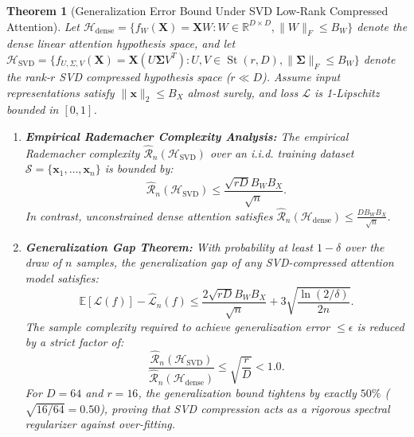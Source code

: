 \documentclass[journal]{IEEEtran}
\newtheorem{theorem}{Theorem}
\begin{document}
\begin{theorem}[Generalization Error Bound Under SVD Low-Rank Compressed Attention]
Let $\mathcal{H}_{\text{dense}} = \{ f_W(\mathbf{X}) = \mathbf{X} W : W \in \mathbb{R}^{D \times D}, \|W\|_F \le B_W \}$ denote the dense linear attention hypothesis space, and let $\mathcal{H}_{\text{SVD}} = \{ f_{U, \Sigma, V}(\mathbf{X}) = \mathbf{X} (U \boldsymbol{\Sigma} V^T) : U, V \in \operatorname{St}(r, D), \|\boldsymbol{\Sigma}\|_F \le B_W \}$ denote the rank-$r$ SVD compressed hypothesis space ($r \ll D$).
Assume input representations satisfy $\|\mathbf{x}\|_2 \le B_X$ almost surely, and loss $\mathcal{L}$ is 1-Lipschitz bounded in $[0, 1]$.

\begin{enumerate}
    \item \textbf{Empirical Rademacher Complexity Analysis:}
    The empirical Rademacher complexity $\hat{\mathcal{R}}_n(\mathcal{H}_{\text{SVD}})$ over an i.i.d. training dataset $\mathcal{S} = \{\mathbf{x}_1, \dots, \mathbf{x}_n\}$ is bounded by:
    \begin{equation}
    \hat{\mathcal{R}}_n(\mathcal{H}_{\text{SVD}}) \le \frac{\sqrt{r D} B_W B_X}{\sqrt{n}}.
    \end{equation}
    In contrast, unconstrained dense attention satisfies $\hat{\mathcal{R}}_n(\mathcal{H}_{\text{dense}}) \le \frac{D B_W B_X}{\sqrt{n}}$.
    
    \item \textbf{Generalization Gap Theorem:}
    With probability at least $1 - \delta$ over the draw of $n$ samples, the generalization gap of any SVD-compressed attention model satisfies:
    \begin{equation}
    \mathbb{E}[\mathcal{L}(f)] - \hat{\mathcal{L}}_n(f) \le \frac{2 \sqrt{r D} B_W B_X}{\sqrt{n}} + 3 \sqrt{\frac{\ln(2/\delta)}{2n}}.
    \end{equation}
    The sample complexity required to achieve generalization error $\le \epsilon$ is reduced by a strict factor of:
    \begin{equation}
    \frac{\hat{\mathcal{R}}_n(\mathcal{H}_{\text{SVD}})}{\hat{\mathcal{R}}_n(\mathcal{H}_{\text{dense}})} \le \sqrt{\frac{r}{D}} < 1.0.
    \end{equation}
    For $D = 64$ and $r = 16$, the generalization bound tightens by exactly $50\%$ ($\sqrt{16/64} = 0.50$), proving that SVD compression acts as a rigorous spectral regularizer against over-fitting.
\end{enumerate}
\end{theorem}
\end{document}
